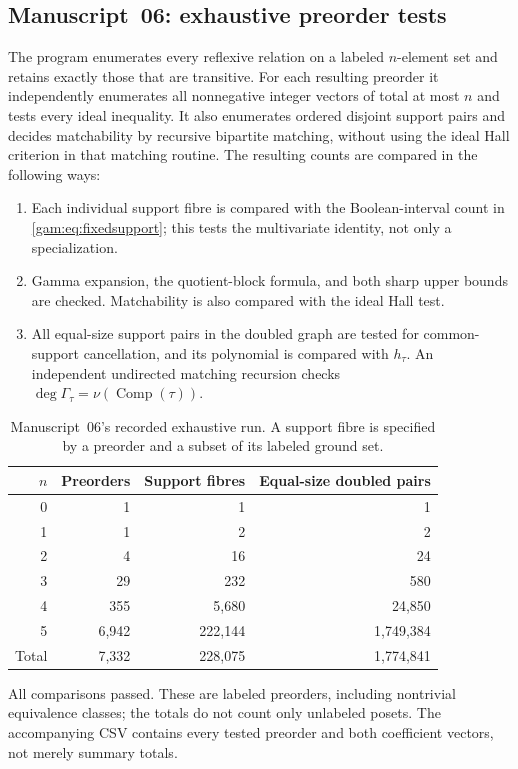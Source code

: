 \documentclass[11pt]{article}
\numberwithin{equation}{section}
\theoremstyle{definition}
\newcommand{\Comp}{\operatorname{Comp}}
\begin{document}
\subsection{Manuscript~06: exhaustive preorder tests}
The program enumerates every reflexive relation on a labeled $n$-element
set and retains exactly those that are transitive. For each resulting
preorder it independently enumerates all nonnegative integer vectors of
total at most $n$ and tests every ideal inequality. It also enumerates
ordered disjoint support pairs and decides matchability by recursive
bipartite matching, without using the ideal Hall criterion in that matching
routine. The resulting counts are compared in the following ways:
\begin{enumerate}[itemsep=2pt,topsep=4pt]
\item Each individual support fibre is compared with the Boolean-interval
count in \eqref{gam:eq:fixedsupport}; this tests the multivariate identity,
not only a specialization.
\item Gamma expansion, the quotient-block formula, and both sharp upper
bounds are checked. Matchability is also compared with the ideal Hall test.
\item All equal-size support pairs in the doubled graph are tested for
common-support cancellation, and its polynomial is compared with $h_\tau$.
An independent undirected matching recursion checks
$\deg\Gamma_\tau=\nu(\Comp(\tau))$.
\end{enumerate}

\begin{table}[htbp]
\centering
\caption{Manuscript~06's recorded exhaustive run. A support fibre is
specified by a preorder and a subset of its labeled ground set.}
\label{gam:tab:checks}
\begin{tabular}{@{}rrrr@{}}
\toprule
$n$ & Preorders & Support fibres & Equal-size doubled pairs\\
\midrule
0 & 1 & 1 & 1\\
1 & 1 & 2 & 2\\
2 & 4 & 16 & 24\\
3 & 29 & 232 & 580\\
4 & 355 & 5,680 & 24,850\\
5 & 6,942 & 222,144 & 1,749,384\\
\midrule
Total & 7,332 & 228,075 & 1,774,841\\
\bottomrule
\end{tabular}
\end{table}
All comparisons passed. These are labeled preorders, including nontrivial
equivalence classes; the totals do not count only unlabeled posets.
The accompanying CSV contains every tested preorder and both coefficient
vectors, not merely summary totals.
\end{document}
